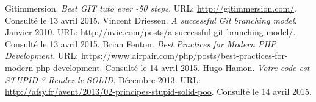 \begin{thebibliography}{ABC}	
     Gitimmersion. \emph{Best GIT tuto ever -50 steps}. URL: \url{http://gitimmersion.com/}. Consulté le 13 avril 2015.
     Vincent Driessen. \emph{A successful Git branching model}. Janvier 2010. URL: \url{http://nvie.com/posts/a-successful-git-branching-model/}. Consulté le 13 avril 2015.
     Brian Fenton. \emph{Best Practices for Modern PHP Development}. URL: \url{https://www.airpair.com/php/posts/best-practices-for-modern-php-development}. Consulté le 14 avril 2015.
     Hugo Hamon. \emph{Votre code est STUPID ? Rendez le SOLID}. Décembre 2013. URL: \url{http://afsy.fr/avent/2013/02-principes-stupid-solid-poo}. Consulté le 14 avril 2015.
\end{thebibliography}
